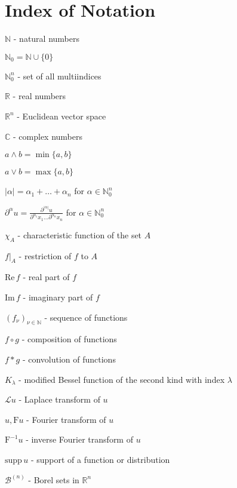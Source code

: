 \documentclass[a4paper, 12pt]{report}
\theoremstyle{remark}
\theoremstyle{definition}
\begin{document}
\chapter*{Index of Notation}

$\mathbb{N}$ - natural numbers

\noindent$\mathbb{N}_0 = \mathbb{N} \cup \{0\}$

\noindent$\mathbb{N}_0^n$ - set of all multiindices

\noindent$\mathbb{R}$ - real numbers

\noindent$\mathbb{R}^n$ - Euclidean vector space

\noindent$\mathbb{C}$ - complex numbers

\noindent$a \wedge b = \min\{a, b\}$

\noindent$a \vee b = \max\{a, b\}$

\noindent$|\alpha| = \alpha_1 + \dots +\alpha_n$ for $\alpha \in \mathbb{N}_0^n$

\noindent$\partial^\alpha u = \frac{\partial^{|\alpha|}u}{\partial^{\alpha_1}x_1\dots\partial^{\alpha_n}x_n}$ for $\alpha \in \mathbb{N}_0^n$

\bigbreak

\noindent$\chi_A$ - characteristic function of the set $A$

\noindent$f|_A$ - restriction of $f$ to $A$

\noindent$\text{Re}\,f$ - real part of $f$

\noindent$\text{Im}\,f$ - imaginary part of $f$

\noindent$(f_\nu)_{\nu \in \mathbb{N}}$ - sequence of functions

\noindent$f \circ g$ - composition of functions

\noindent$f \ast g$ - convolution of functions

\noindent$K_\lambda$ - modified Bessel function of the second kind with index $\lambda$

\noindent$\mathcal{L}u$ - Laplace transform of $u$

\noindent$\hat{u}, \mathrm{F}u$ - Fourier transform of $u$

\noindent$\mathrm{F}^{-1}u$ - inverse Fourier transform of $u$

\noindent$\text{supp}\,u$ - support of a function or distribution

\bigbreak

\noindent$\mathcal{B}^{(n)}$ - Borel sets in $\mathbb{R}^n$
\end{document}
